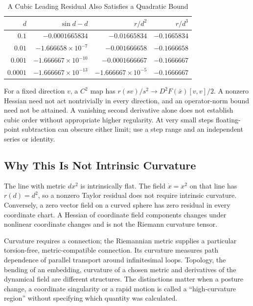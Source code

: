 \begin{table}[htbp]
\centering
\caption{A Cubic Leading Residual Also Satisfies a Quadratic Bound}
\label{tab:ch1:sin-residual}
\begin{tabular}{@{}rrrr@{}}
\toprule
$d$ & $\sin d-d$ & $r/d^2$ & $r/d^3$ \\
\midrule
$0.1$ & $-0.0001665834$ & $-0.01665834$ & $-0.1665834$ \\
$0.01$ & $-1.666658\times10^{-7}$ & $-0.001666658$ & $-0.1666658$ \\
$0.001$ & $-1.666667\times10^{-10}$ & $-0.0001666667$ & $-0.1666667$ \\
$0.0001$ & $-1.666667\times10^{-13}$ & $-1.666667\times10^{-5}$ & $-0.1666667$ \\
\bottomrule
\end{tabular}
\end{table}

For a fixed direction $v$, a $C^2$ map has $r(sv)/s^2\to D^2F(\bar x)[v,v]/2$.
A nonzero Hessian need not act nontrivially in every direction, and an operator-norm bound
need not be attained. A vanishing second derivative alone does not establish cubic order
without appropriate higher regularity. At very small steps floating-point subtraction
can obscure either limit; use a step range and an independent series or identity.

\subsection{Why This Is Not Intrinsic Curvature}

The line with metric $dx^2$ is intrinsically flat. The field $\dot x=x^2$ on that line has
$r(d)=d^2$, so a nonzero Taylor residual does not require intrinsic curvature. Conversely,
a zero vector field on a curved sphere has zero residual in every coordinate chart. A
Hessian of coordinate field components changes under nonlinear coordinate changes and
is not the Riemann curvature tensor.

Curvature requires a connection; the Riemannian metric supplies a particular torsion-free,
metric-compatible connection. Its curvature measures path dependence of parallel transport
around infinitesimal loops. Topology, the bending of an embedding, curvature of a chosen
metric and derivatives of the dynamical field are different structures. The distinctions
matter when a posture change, a coordinate singularity or a rapid motion is called a
``high-curvature region'' without specifying which quantity was calculated.

